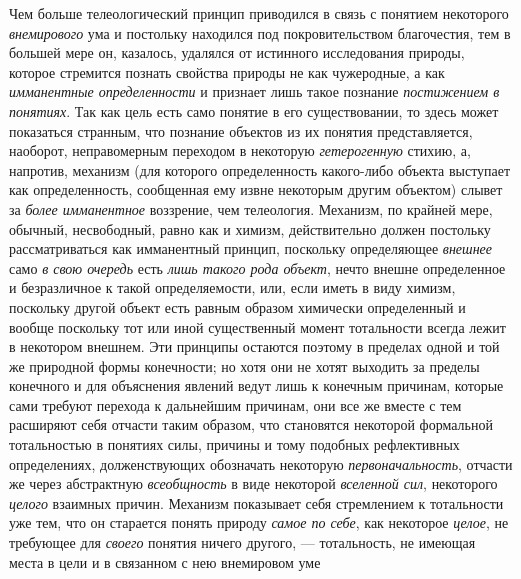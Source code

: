 \documentclass[twoside]{article}
\begin{document}
{{{{Чем больше телеологический принцип приводился в связь с
понятием некоторого {\em внемирового}
ума и постольку находился под покровительством благочестия,
тем в большей мере он, казалось, удалялся от истинного исследования
природы, которое стремится познать свойства природы не как чужеродные, а
как {\em имманентные определенности}
и признает лишь такое познание
{\em постижением в понятиях}.
Так как цель есть само понятие в его существовании, то здесь
может показаться странным, что познание объектов из их понятия
представляется, наоборот, неправомерным переходом в некоторую
{\em гетерогенную}
стихию, а, напротив, механизм (для которого определенность
какого-либо объекта выступает как определенность, сообщенная ему извне
некоторым другим объектом) слывет за
{\em более имманентное}
воззрение, чем телеология. Механизм, по крайней мере,
обычный, несвободный, равно как и химизм, действительно должен постольку
рассматриваться как имманентный принцип, поскольку определяющее
{\em внешнее} само
{\em в свою очередь} есть
{\em лишь такого рода объект},
нечто внешне определенное и безразличное к такой
определяемости, или, если иметь в виду химизм, поскольку другой объект есть
равным образом химически определенный и вообще поскольку тот или иной
существенный момент тотальности всегда лежит в некотором внешнем. Эти
принципы остаются поэтому в пределах одной и той же природной формы
конечности; но хотя они не хотят выходить за пределы
конечного и для объяснения явлений ведут лишь к конечным причинам, которые
сами требуют перехода к дальнейшим причинам, они все же вместе с тем
расширяют себя отчасти таким образом, что становятся некоторой формальной
тотальностью в понятиях силы, причины и тому подобных рефлективных
определениях, долженствующих обозначать некоторую
{\em первоначальность},
отчасти же через абстрактную
{\em всеобщность} в виде
некоторой {\em вселенной сил},
некоторого {\em целого}
взаимных причин. Механизм показывает себя стремлением к
тотальности уже тем, что он старается понять природу
{\em самое по себе}, как
некоторое {\em целое}, не
требующее для {\em своего}
понятия ничего другого, — тотальность, не
имеющая места в цели и в связанном с нею внемировом
уме~}}}}
\end{document}
